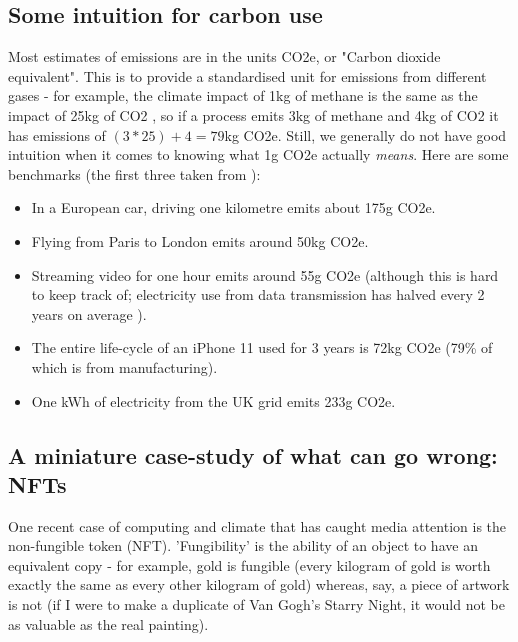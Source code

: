 \documentclass{article}
\begin{document}
\subsection{Some intuition for carbon use}
Most estimates of emissions are in the units CO2e, or "Carbon dioxide equivalent". This is to provide a standardised unit for emissions from different gases - for example, the climate impact of 1kg of methane is the same as the impact of 25kg of CO2 \citep{forster2007changes}, so if a process emits 3kg of methane and 4kg of CO2 it has emissions of $(3*25)+4=79$kg CO2e. Still, we generally do not have good intuition when it comes to knowing what 1g CO2e actually \emph{means}. Here are some benchmarks (the first three taken from \citet{lannelongue2021ten}):
\begin{itemize}
\item In a European car, driving one kilometre emits about 175g CO2e.
\item Flying from Paris to London emits around 50kg CO2e.
\item Streaming video for one hour emits around 55g CO2e (although this is hard to keep track of; electricity use from data transmission has halved every 2 years on average \citep{aslan2018electricity}).
\item The entire life-cycle of an iPhone 11 used for 3 years is 72kg CO2e (79\% of which is from manufacturing). \citep{apple2019product}
\item One kWh of electricity from the UK grid emits 233g CO2e. \citep{uk2020greenhouse}
\end{itemize}


\subsection{A miniature case-study of what can go wrong: NFTs}
One recent case of computing and climate that has caught media attention is the non-fungible token (NFT). 'Fungibility' is the ability of an object to have an equivalent copy - for example, gold is fungible (every kilogram of gold is worth exactly the same as every other kilogram of gold) whereas, say, a piece of artwork is not (if I were to make a duplicate of Van Gogh's Starry Night, it would not be as valuable as the real painting). \newline
\end{document}
